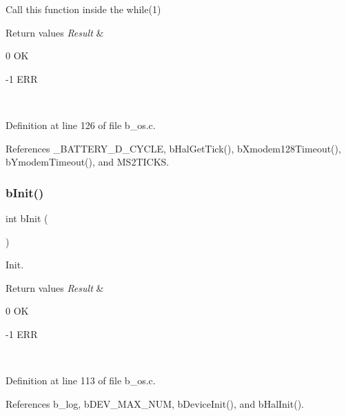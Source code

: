 Call this function inside the while(1) 


\begin{DoxyRetVals}{Return values}
{\em Result} & \begin{DoxyItemize}
\item 0 OK \item -\/1 E\+RR \end{DoxyItemize}
\\
\hline
\end{DoxyRetVals}


Definition at line 126 of file b\+\_\+os.\+c.



References \+\_\+\+B\+A\+T\+T\+E\+R\+Y\+\_\+\+D\+\_\+\+C\+Y\+C\+LE, b\+Hal\+Get\+Tick(), b\+Xmodem128\+Timeout(), b\+Ymodem\+Timeout(), and M\+S2\+T\+I\+C\+KS.

\mbox{\label{group___b_o_s___exported___functions_ga77d7bd12027132a4366d65f361d09503}} 
\subsubsection{\texorpdfstring{b\+Init()}{bInit()}}
{\footnotesize\ttfamily int b\+Init (\begin{DoxyParamCaption}{ }\end{DoxyParamCaption})}



Init. 


\begin{DoxyRetVals}{Return values}
{\em Result} & \begin{DoxyItemize}
\item 0 OK \item -\/1 E\+RR \end{DoxyItemize}
\\
\hline
\end{DoxyRetVals}


Definition at line 113 of file b\+\_\+os.\+c.



References b\+\_\+log, b\+D\+E\+V\+\_\+\+M\+A\+X\+\_\+\+N\+UM, b\+Device\+Init(), and b\+Hal\+Init().

